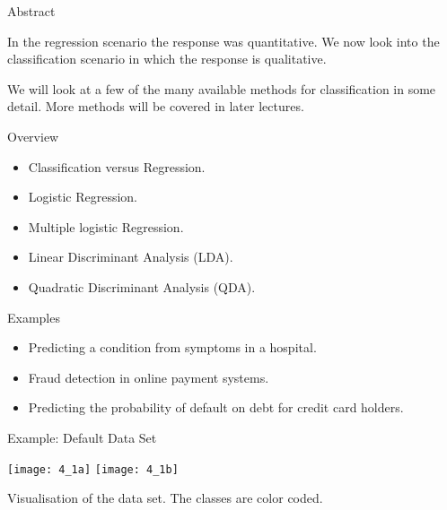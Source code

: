 \documentclass[mathserif, aspectratio=169]{beamer}
\subtitle{\bfseries%
	{Classification}\\%
  {\tiny\it The classification scenario, Logistic Regression, Linear Discriminant Analysis, Quadratic Discriminant Analysis}\\%
}
\begin{document}


\begin{frame}{Abstract}
	\begin{blurb}
		In the regression scenario the response was quantitative. We now look into the 
		classification scenario in which the response is qualitative. 

		We will look at a few of the many available methods for classification in some detail.
		More methods will be covered in later lectures.
	\end{blurb}
\end{frame}

\begin{frame}{Overview}
	\begin{itemize}
		\item Classification versus Regression.
		\item Logistic Regression.
		\item Multiple logistic Regression.
		\item Linear Discriminant Analysis (LDA).
		\item Quadratic Discriminant Analysis (QDA).
	\end{itemize}
\end{frame}

\begin{frame}{Examples}
	\begin{itemize}
		\item Predicting a condition from symptoms in a hospital.
		\item Fraud detection in online payment systems.
		\item Predicting the probability of default on debt for credit card holders.
	\end{itemize}

\end{frame}

\begin{frame}{Example: Default Data Set}
	\begin{center}
		\texttt{[image: 4\_1a]}
		\texttt{[image: 4\_1b]}
	\end{center}

	Visualisation of the  data set. The classes are color coded.

\end{frame}
\end{document}
